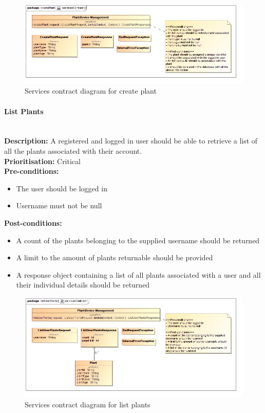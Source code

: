 \documentclass{article}
\begin{document}
\begin{figure}[H]
	\includegraphics[width=\linewidth]{images/ServicesContracts/createPlant.jpg}
	\caption{Services contract diagram for create plant}
\end{figure}

\paragraph{List Plants}\mbox{}\\
\textbf{Description:} A registered and logged in user should be able to retrieve a list of all the plants associated with their account.\\
\textbf{Prioritisation:} Critical\\		
\textbf{Pre-conditions:}
\begin{itemize}
	\item The user should be logged in
	\item Username must not be null
\end{itemize}
\textbf{Post-conditions:}
\begin{itemize}
	\item A count of the plants belonging to the supplied username should be returned
	\item A limit to the amount of plants returnable should be provided
	\item A response object containing a list of all plants associated with a user and all their individual details should be returned
\end{itemize}

\begin{figure}[H]
	\includegraphics[width=\linewidth]{images/ServicesContracts/listUserPlants.jpg}
	\caption{Services contract diagram for list plants}
\end{figure}
\end{document}
